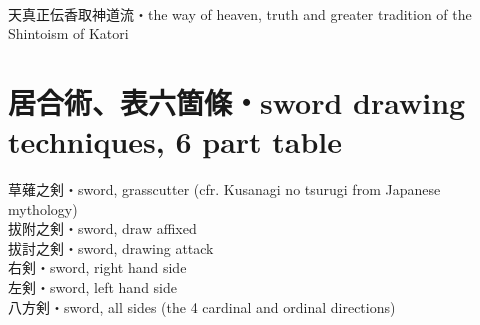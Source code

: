 \documentclass[dvipdfmx, a4paper, 12pt]{utarticle}
\begin{document}
\begin{CJK*}{UTF8}{min}
\begin{landscape}
\setcounter{section}{0}
\newpage
\pagestyle{empty}
\section{}
\noindent {}\\
\\
\\
\\
\\
\\
\section{}
\noindent {}\\
\\
\\
\\
\\
\\

\setcounter{section}{0}
\newpage
\pagestyle{empty}
天真正伝香取神道流・the way of heaven, truth and greater tradition of the Shintoism of Katori
\section{居合術、表六箇條・sword drawing techniques, 6 part table}
\noindent 草薙之剣・sword, grasscutter (cfr. Kusanagi no tsurugi from Japanese mythology)\\
拔附之剣・sword, draw affixed\\
拔討之剣・sword, drawing attack\\
右剣・sword, right hand side\\
左剣・sword, left hand side\\
八方剣・sword, all sides (the 4 cardinal and ordinal directions)\\

\end{landscape}
\end{CJK*}
\end{document}
